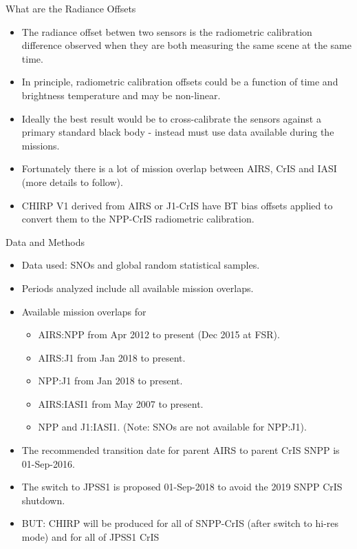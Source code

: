 \documentclass[10pt,t]{beamer}
\begin{document}
\begin{frame}{What are the Radiance Offsets}

  \begin{itemize}
  \item The radiance offset betwen two sensors is the radiometric calibration
    difference observed when they are both measuring the same scene at the same time.
  \item In principle, radiometric calibration offsets could be a function of time and
    brightness temperature and may be non-linear.
  \item Ideally the best result would be to cross-calibrate the sensors against a primary
    standard black body - instead must use data available during the missions.
  \item Fortunately there is a lot of mission overlap between AIRS, CrIS and IASI
    (more details to follow).
  \item CHIRP V1 derived from AIRS or J1-CrIS have BT bias offsets applied to convert them to the NPP-CrIS radiometric calibration.

  \end{itemize}

\end{frame}

\begin{frame}{Data and Methods}

  \begin{itemize}
    \item Data used: SNOs and global random statistical samples.
    \item Periods analyzed include all available mission overlaps.
    \item Available mission overlaps for
      \begin{itemize}
      \item AIRS:NPP from Apr 2012 to present (Dec 2015 at FSR).
      \item AIRS:J1 from Jan 2018 to present.
      \item NPP:J1 from Jan 2018 to present.
      \item AIRS:IASI1 from May 2007 to present.
      \item NPP and J1:IASI1. (Note: SNOs are not available for NPP:J1).
      \end{itemize}
      
    \item The recommended transition date for parent AIRS to parent CrIS SNPP is 01-Sep-2016.
    \item The switch to JPSS1 is proposed 01-Sep-2018 to avoid the 2019 SNPP CrIS       shutdown.
    \item BUT: CHIRP will be produced for all of SNPP-CrIS (after switch to hi-res mode) and for all of JPSS1 CrIS


  \end{itemize}
\end{frame}
\end{document}
